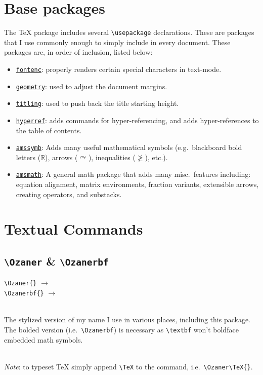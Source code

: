 \documentclass{article}
\begin{document}
\section{Base packages}
The \Ozaner\TeX{} package includes several \texttt{\textbackslash usepackage} declarations. These are packages that I use commonly enough to simply include in every document. These packages are, in order of inclusion, listed below:
\begin{itemize}
  \item \href{https://ctan.org/pkg/titling}{\texttt{fontenc}}: properly renders certain special characters in text-mode.
  \item \href{https://ctan.org/pkg/geometry}{\texttt{geometry}}: used to adjust the document margins.
  \item \href{https://ctan.org/pkg/titling}{\texttt{titling}}: used to push back the title starting height.
  \item \href{https://ctan.org/pkg/hyperref}{\texttt{hyperref}}: adds commands for hyper-referencing, and adds hyper-references to the table of contents.
  \item \href{https://ctan.org/pkg/amsfonts}{\texttt{amssymb}}: Adds many useful mathematical symbols (e.g.\ blackboard bold letters ($\mathbb{R}$), arrows ($\curvearrowright$), inequalities ($\ngeq$), etc.).
  \item \href{https://ctan.org/pkg/amsmath}{\texttt{amsmath}}: A general math package that adds many misc.\ features including: equation alignment, matrix environments, fraction variants, extensible arrows, creating operators, and substacks.
\end{itemize}

\section{Textual Commands}
\subsection{\texttt{\textbackslash Ozaner} \& \texttt{\textbackslash Ozanerbf}}
\texttt{\textbackslash Ozaner\{\}} $\longrightarrow$ \Ozaner{}\\
\texttt{\textbackslash Ozanerbf\{\}} $\longrightarrow$ \Ozanerbf{}

\noindent\\The stylized version of my name I use in various places, including this package. The bolded version (i.e.\ \texttt{\textbackslash Ozanerbf}) is necessary as \texttt{\textbackslash textbf} won't boldface embedded math symbols.

\noindent\\\textit{Note}: to typeset \Ozaner\TeX{} simply append \texttt{\textbackslash TeX} to the command, i.e.\ \texttt{\textbackslash Ozaner\textbackslash TeX\{\}}.
\end{document}
